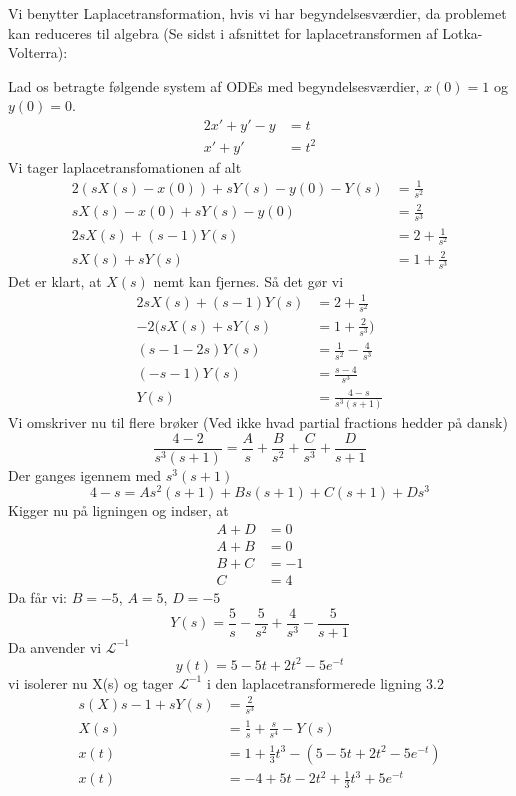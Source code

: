 Vi benytter Laplacetransformation, hvis vi har begyndelsesværdier, da problemet kan reduceres til algebra (Se sidst i afsnittet for laplacetransformen af Lotka-Volterra):
\begin{Example}
\textnormal{Lad os betragte følgende system af ODEs med begyndelsesværdier, $x(0)=1$ og $y(0)=0$.}
\begin{align}
    2x' + y' - y &= t\\
    x' + y' &= t^2
\end{align}
\textnormal{Vi tager laplacetransfomationen af alt}
\begin{align*}
    2(s X(s) - x(0)) + sY(s) - y(0) - Y(s) &= \frac{1}{s^2}\\
    s X(s) - x(0) + sY(s) - y(0) &= \frac{2}{s^3}\\
    2sX(s) + (s-1)Y(s) &= 2 + \frac{1}{s^2}\\
    sX(s) + sY(s) &= 1 + \frac{2}{s^3}
\end{align*}
\textnormal{Det er klart, at $X(s)$ nemt kan fjernes. Så det gør vi}
\begin{align*}
    2sX(s) + (s-1)Y(s) &= 2 + \frac{1}{s^2}\\
    -2(sX(s) + sY(s) &= 1 + \frac{2}{s^3})\\
    (s-1-2s)Y(s) &= \frac{1}{s^2} - \frac{4}{s^3}\\
    (-s-1)Y(s) &= \frac{s-4}{s^3}\\
    Y(s) &= \frac{4-s}{s^3(s + 1)}
\end{align*}
\textnormal{Vi omskriver nu til flere brøker (Ved ikke hvad partial fractions hedder på dansk)}
$$ \frac{4-2}{s^3(s+1)} = \frac{A}{s} + \frac{B}{s^2} + \frac{C}{s^3} + \frac{D}{s+1}$$
\textnormal{Der ganges igennem med $s^3(s+1)$}
$$ 4 - s = A s^2(s+1) + Bs(s+1) + C(s+1) + Ds^3$$
\textnormal{Kigger nu på ligningen og indser, at}
\begin{align*}
    A + D &= 0\\
    A + B &= 0\\
    B + C &= -1\\
    C &= 4
\end{align*}
\textnormal{Da får vi: $B = -5$, $A = 5$, $D = -5$}
$$Y(s) = \frac{5}{s} -\frac{5}{s^2} + \frac{4}{s^3} - \frac{5}{s+1}$$
\textnormal{Da anvender vi $\mathcal{L}^{-1}$}
$$ y(t) = 5 - 5t + 2t^2 - 5e^{-t}$$
\textnormal{vi isolerer nu X(s) og tager $\mathcal{L}^{-1}$ i den laplacetransformerede ligning 3.2}
\begin{align*}
    s(X)s - 1 + sY(s) &= \frac{2}{s^3}\\
    X(s) &= \frac{1}{s} + \frac{s}{s^4} - Y(s)\\
    x(t) &= 1 + \frac{1}{3}t^3 - (5 - 5t + 2t^2 - 5e^{-t})\\
    x(t) &= -4 + 5t-2t^2 + \frac{1}{3}t^3 + 5e^{-t}
\end{align*}

\end{Example}



